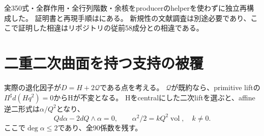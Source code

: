 \documentclass[a4paper,11pt]{ltjsarticle}
\theoremstyle{definition}
\begin{document}
全350式・全群作用・全行列階数・余核をproducerのhelperを使わずに独立再構成した。
証明書と再現手順はにある。
新規性の文献調査は別途必要であり、ここで証明した相違はリポジトリの従前58成分との相違である。

\section{二重二次曲面を持つ支持の被覆}
実際の退化因子が$D=H+2\mathcal Q$である点を考える。
$\mathcal Q$が既約なら、primitive liftの$\Pi^\sharp d(Hq^2)=0$からHが不変となる。
Hをcentralにした二次liftを選ぶと、affine逆二形式は$\alpha/Q^2$となり、
\[
 Qd\alpha-2dQ\wedge\alpha=0,\qquad \alpha^2/2=kQ^2\operatorname{vol},\quad k\ne0.
\]
ここで$\deg\alpha\le2$であり、全90係数を残す。
\end{document}
